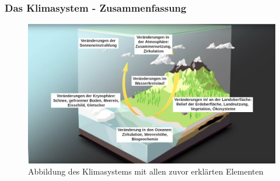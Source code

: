 \begin{frame}
	\frametitle{Das Klimasystem - Zusammenfassung}
	
	\begin{figure}
		\centering
		\includegraphics{bilder/WMO_Cycles_overview.png}
		\caption{Abbildung des Klimasystems mit allen zuvor erklärten Elementen}
	\end{figure}
\end{frame}


